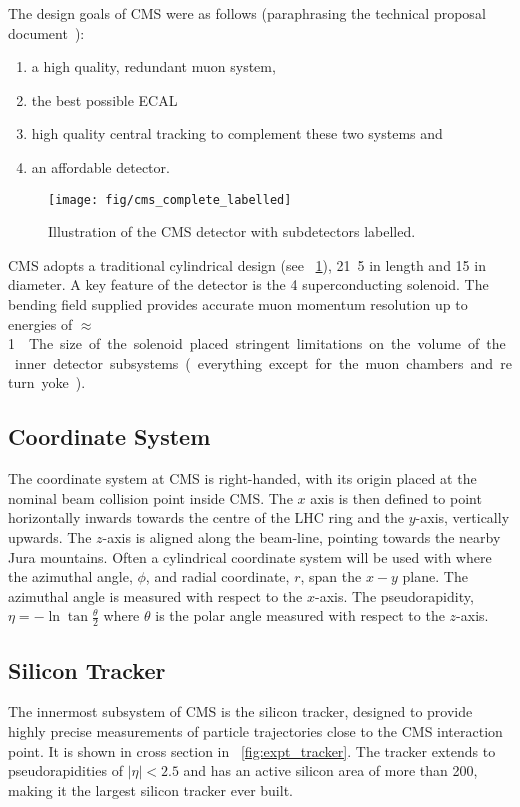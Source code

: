 The design goals of CMS were as follows (paraphrasing the technical proposal
document~\cite{cms_technical_proposal}):
\begin{enumerate}
\item a high quality, redundant muon system,
\item the best possible \ac{ECAL}
\item high quality central tracking to complement these two systems and
\item an affordable detector.
\end{enumerate}

\begin{figure}[h!]
\centering
\texttt{[image: fig/cms\_complete\_labelled]}
\caption[Illustration of the \ac{CMS} detector]{Illustration of the \ac{CMS}
  detector with subdetectors labelled.}
\label{fig:expt_cms}
\end{figure}

\ac{CMS} adopts a traditional cylindrical design (see
\fig~\ref{fig:expt_cms}), \unit{21.5}{\metre} in length and \unit{15}{\metre}
in diameter. A key feature of the detector is the \unit{4}{\tesla}
superconducting solenoid. The bending field supplied provides accurate muon
momentum resolution up to energies of \unit{$\approx$ 1}{\TeV}. The size of the
solenoid placed stringent limitations on the volume of the inner detector
subsystems (everything except for the muon chambers and return yoke).

\subsection{Coordinate System}
The coordinate system at \ac{CMS} is right-handed, with its origin placed at the
nominal beam collision point inside \ac{CMS}. The $x$ axis is then defined to
point horizontally inwards towards the centre of the \ac{LHC} ring and the
$y$-axis, vertically upwards. The $z$-axis is aligned along the beam-line,
pointing towards the nearby Jura mountains. Often a cylindrical coordinate
system will be used with where the azimuthal angle, $\phi$, and radial
coordinate, $r$, span the $x-y$ plane. The azimuthal angle is measured with
respect to the $x$-axis. The pseudorapidity, $\eta = - \ln \tan
\frac{\theta}{2}$ where $\theta$ is the polar angle measured with respect to the
$z$-axis.

\subsection{Silicon Tracker}
The innermost subsystem of \ac{CMS} is the silicon tracker, designed to provide
highly precise measurements of particle trajectories close to the CMS
interaction point. It is shown in cross section in
\fig~\ref{fig:expt_tracker}. The tracker extends to pseudorapidities of
$|\eta|<2.5$ and has an active silicon area of more than
\unit{200}{\metre\squared}, making it the largest silicon tracker ever built.

